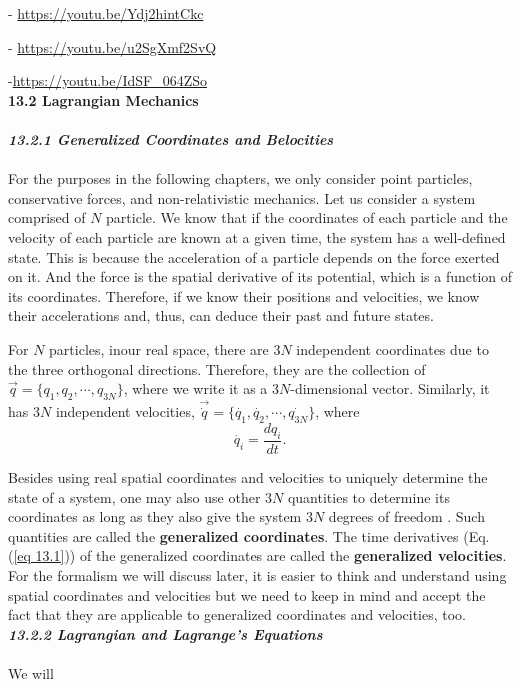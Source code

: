 \documentclass{article}
\newcommand{\bfit}[1]{\textit{\textbf{#1}}}
\begin{document}
- \url{https://youtu.be/Ydj2hintCkc}

- \url{https://youtu.be/u2SgXmf2SvQ}

-\url{https://youtu.be/IdSF_064ZSo}
\\[30pt]
\textbf{\large 13.2 Lagrangian Mechanics}
\\\\
\bfit{\large 13.2.1 Generalized Coordinates and Belocities}
\\\\
For the purposes in the following chapters, we only consider point particles, conservative forces,
and non-relativistic mechanics. Let us consider a system comprised of $N$ 
particle. We know that if the coordinates of each particle and the velocity of each particle are known at a 
given  time, the system has a well-defined state. This is because the
acceleration of a particle depends on the force exerted on it. 
And the force is the spatial derivative of its potential, which is a function of its
coordinates. Therefore, if we know their positions and velocities, we know
their accelerations and, thus, can deduce their past and future states.

For $N$ particles, inour real space, there are 3$N$ independent coordinates
due to the three orthogonal directions. Therefore, they are the collection of 
$\vec{q}=\{ q_1,q_2,\cdots,q_{3N} \}$, where we write it as a 3$N$-dimensional vector.
Similarly, it has 3$N$ independent velocities, $\vec{\dot{q}}=\{ \dot{q_1},\dot{q_2},\cdots,\dot{q_{3N}} \}$, where
\begin{equation}\label{eq 13.1}
    \dot{q_i}=\frac{dq_i}{dt}. \tag{13.1}
\end{equation}

Besides using real spatial coordinates and velocities to uniquely determine the
state of a system, one may also use other 3$N$ quantities to determine its coordinates as long as
they also give the system 3$N$ degrees of freedom \cite{Landau}. Such quantities are called
the \textbf{generalized coordinates}. The time derivatives (Eq.(\ref{eq 13.1})) of the
generalized coordinates are called the \textbf{generalized velocities}. For the formalism we will
discuss later, it is easier to think and understand using spatial coordinates and velocities but
we need to keep in mind and accept the fact that they are applicable to generalized coordinates and velocities, too.
\\[20pt]
\bfit{\large 13.2.2 Lagrangian and Lagrange's Equations}
\\\\
We will

\printbibliography
\end{document}
